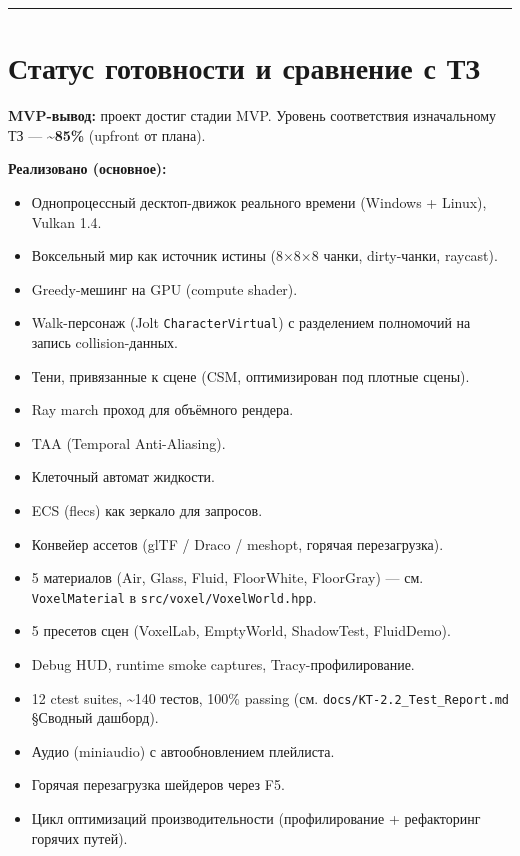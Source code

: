 
\begin{center}\rule{0.5\linewidth}{0.5pt}\end{center}

\section{Статус готовности и сравнение с ТЗ}\label{KT-3.2_Final_Report-ux441ux442ux430ux442ux443ux441-ux433ux43eux442ux43eux432ux43dux43eux441ux442ux438-ux438-ux441ux440ux430ux432ux43dux435ux43dux438ux435-ux441-ux442ux437}

\textbf{MVP-вывод:} проект достиг стадии MVP. Уровень соответствия изначальному ТЗ --- \textbf{\textasciitilde85\%} (upfront от плана).

\textbf{Реализовано (основное):}

\begin{itemize}
\tightlist
\item
  Однопроцессный десктоп-движок реального времени (Windows + Linux), Vulkan 1.4.
\item
  Воксельный мир как источник истины (8×8×8 чанки, dirty-чанки, raycast).
\item
  Greedy-мешинг на GPU (compute shader).
\item
  Walk-персонаж (Jolt \texttt{CharacterVirtual}) с разделением полномочий на запись collision-данных.
\item
  Тени, привязанные к сцене (CSM, оптимизирован под плотные сцены).
\item
  Ray march проход для объёмного рендера.
\item
  TAA (Temporal Anti-Aliasing).
\item
  Клеточный автомат жидкости.
\item
  ECS (flecs) как зеркало для запросов.
\item
  Конвейер ассетов (glTF / Draco / meshopt, горячая перезагрузка).
\item
  5 материалов (Air, Glass, Fluid, FloorWhite, FloorGray) --- см. \texttt{VoxelMaterial} в \texttt{src/voxel/VoxelWorld.hpp}.
\item
  5 пресетов сцен (VoxelLab, EmptyWorld, ShadowTest, FluidDemo).
\item
  Debug HUD, runtime smoke captures, Tracy-профилирование.
\item
  12 ctest suites, \textasciitilde140 тестов, 100\% passing (см. \texttt{docs/KT-2.2\_Test\_Report.md} §Сводный дашборд).
\item
  Аудио (miniaudio) с автообновлением плейлиста.
\item
  Горячая перезагрузка шейдеров через F5.
\item
  Цикл оптимизаций производительности (профилирование + рефакторинг горячих путей).
\end{itemize}

